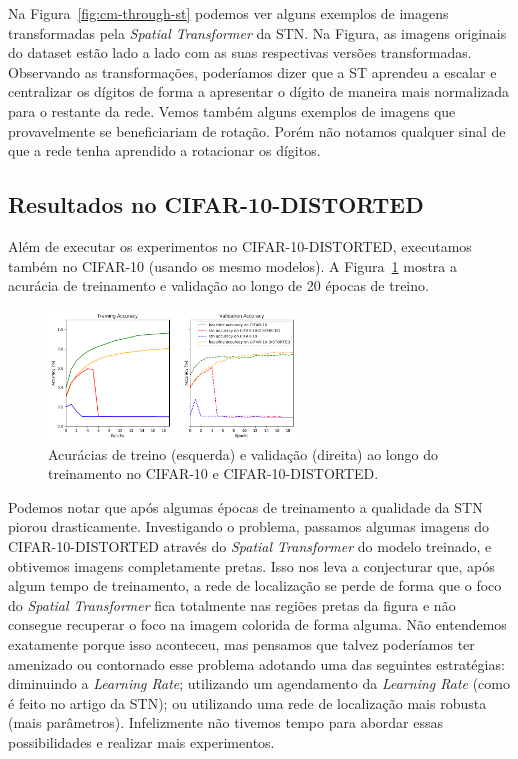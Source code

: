\documentclass[conference]{IEEEtran}
\begin{document}
Na Figura~\ref{fig:cm-through-st} podemos ver alguns exemplos de imagens transformadas pela \textit{Spatial Transformer} da STN. Na Figura, as imagens originais do dataset estão lado a lado com as suas respectivas versões transformadas. Observando as transformações, poderíamos dizer que a ST aprendeu a escalar e centralizar os dígitos de forma a apresentar o dígito de maneira mais normalizada para o restante da rede. Vemos também alguns exemplos de imagens  que provavelmente se beneficiariam de rotação. Porém não notamos qualquer sinal de que a rede tenha aprendido a rotacionar os dígitos.

\subsection{Resultados no CIFAR-10-DISTORTED}

Além de executar os experimentos no CIFAR-10-DISTORTED, executamos também no CIFAR-10 (usando os mesmo modelos). A Figura~\ref{fig:c10-training-accs} mostra a acurácia de treinamento e validação ao longo de 20 épocas de treino.

\begin{figure}[ht!]
  \centering
  \includegraphics[width=250px]{img/C10-training-accs.png}
  \caption{Acurácias de treino (esquerda) e validação (direita) ao longo do treinamento no CIFAR-10 e CIFAR-10-DISTORTED.}
  \label{fig:c10-training-accs}
\end{figure}

Podemos notar que após algumas épocas de treinamento a qualidade da STN piorou drasticamente. Investigando o problema, passamos algumas imagens do CIFAR-10-DISTORTED através do \textit{Spatial Transformer} do modelo treinado, e obtivemos imagens completamente pretas. Isso nos leva a conjecturar que, após algum tempo de treinamento, a rede de localização se perde de forma que o foco do \textit{Spatial Transformer} fica totalmente nas regiões pretas da figura e não consegue recuperar o foco na imagem colorida de forma alguma. Não entendemos exatamente porque isso aconteceu, mas pensamos que talvez poderíamos ter amenizado ou contornado esse problema adotando uma das seguintes estratégias: diminuindo a \textit{Learning Rate}; utilizando um agendamento da \textit{Learning Rate} (como é feito no artigo da STN); ou utilizando uma rede de localização mais robusta (mais parâmetros). Infelizmente não tivemos tempo para abordar essas possibilidades e realizar mais experimentos.
\end{document}
